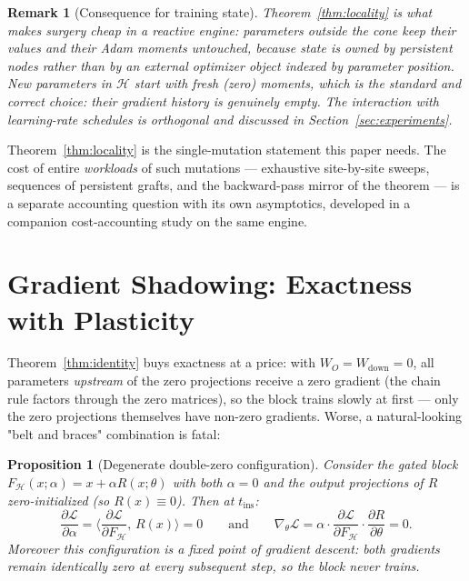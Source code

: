 \documentclass[11pt,a4paper]{article}
\newtheorem{proposition}{Proposition}
\newtheorem{remark}{Remark}
\newcommand{\Hb}{\mathcal{H}}
\newcommand{\Loss}{\mathcal{L}}
\begin{document}
\begin{remark}[Consequence for training state]
Theorem~\ref{thm:locality} is what makes surgery cheap in a reactive engine: parameters outside the cone keep their values \emph{and} their Adam moments untouched, because state is owned by persistent nodes rather than by an external optimizer object indexed by parameter position. New parameters in $\Hb$ start with fresh (zero) moments, which is the standard and correct choice: their gradient history is genuinely empty. The interaction with learning-rate schedules is orthogonal and discussed in Section~\ref{sec:experiments}.
\end{remark}

Theorem~\ref{thm:locality} is the single-mutation statement this paper needs. The cost of entire \emph{workloads} of such mutations --- exhaustive site-by-site sweeps, sequences of persistent grafts, and the backward-pass mirror of the theorem --- is a separate accounting question with its own asymptotics, developed in a companion cost-accounting study on the same engine.

\section{Gradient Shadowing: Exactness with Plasticity}
\label{sec:shadow}

Theorem~\ref{thm:identity} buys exactness at a price: with $W_O = W_{\mathrm{down}} = 0$, all parameters \emph{upstream} of the zero projections receive a zero gradient (the chain rule factors through the zero matrices), so the block trains slowly at first --- only the zero projections themselves have non-zero gradients. Worse, a natural-looking "belt and braces" combination is fatal:

\begin{proposition}[Degenerate double-zero configuration]
\label{prop:saddle}
Consider the gated block $F_{\Hb}(x; \alpha) = x + \alpha R(x; \theta)$ with \emph{both} $\alpha = 0$ and the output projections of $R$ zero-initialized (so $R(x) \equiv 0$). Then at $t_{\mathrm{ins}}$:
\[
\frac{\partial \Loss}{\partial \alpha} = \Big\langle \frac{\partial \Loss}{\partial F_{\Hb}},\, R(x) \Big\rangle = 0
\qquad \text{and} \qquad
\nabla_{\theta} \Loss = \alpha \cdot \frac{\partial \Loss}{\partial F_{\Hb}} \cdot \frac{\partial R}{\partial \theta} = 0 .
\]
Moreover this configuration is a fixed point of gradient descent: both gradients remain identically zero at every subsequent step, so the block never trains.
\end{proposition}
\end{document}
